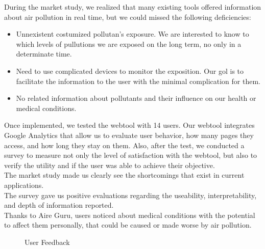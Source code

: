 During the market study, we realized that many existing tools offered information about air pollution in real time, but we could missed the following deficiencies:
\begin{itemize}
    \item Unnexistent costumized pollutan's exposure. We are interested to know to which levels of pullutions we are exposed on the long term, no only in a determinate time.
    \item Need to use complicated devices to monitor the exposition. Our gol is to facilitate the information to the user with the minimal complication for them.
    \item No related information about pollutants and their influence on our health or medical conditions.
\end{itemize}

Once implemented, we tested the webtool with 14 users. Our webtool integrates Google Analytics that allow us to evaluate
user behavior, how many pages they access, and how long they stay on them. Also, after the test, we conducted a survey to measure not only the level of satisfaction with the webtool, but also to verify the utility and if the user was able to achieve their objective.\\

The market study made us clearly see the shortcomings that exist in current applications.\\

The survey gave us positive evaluations regarding the useability, interpretability, and depth of information reported.\\

Thanks to Aire Guru, users noticed about medical conditions with the potential to affect them personally, that could be caused or made worse by air pollution.\\

\begin{figure}[ht]
    \centering
    \hfill
    \caption{User Feedback}
\end{figure}